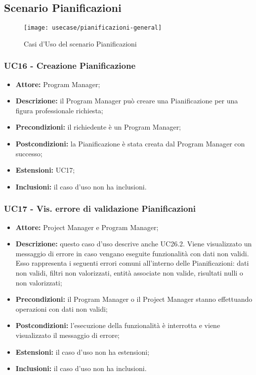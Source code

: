 \subsection{Scenario Pianificazioni}
\begin{figure}[H] 
	\centering
    \texttt{[image: usecase/pianificazioni-general]} 
    \caption{Casi d'Uso del scenario Pianificazioni}
\end{figure}

\subsubsection*{UC16 - Creazione Pianificazione}
\begin{itemize}[label=$\circ$]
\item \textbf{Attore:} Program Manager;
\item \textbf{Descrizione:} il Program Manager può creare una Pianificazione per una figura professionale richiesta;
\item \textbf{Precondizioni:} il richiedente è un Program Manager;
\item \textbf{Postcondizioni:} la Pianificazione è stata creata dal Program Manager con successo;
\item \textbf{Estensioni:} UC17;
\item \textbf{Inclusioni:} il caso d'uso non ha inclusioni.
\end{itemize}

\subsubsection*{UC17 - Vis. errore di validazione Pianificazioni}
\begin{itemize}[label=$\circ$]
\item \textbf{Attore:} Project Manager e Program Manager;
\item \textbf{Descrizione:} questo caso d'uso descrive anche UC26.2. Viene visualizzato un messaggio di errore in caso vengano eseguite funzionalità con dati non validi. Esso rappresenta i seguenti errori comuni all'interno delle Pianificazioni: dati non validi, filtri non valorizzati, entità associate non valide, risultati nulli o non valorizzati;
\item \textbf{Precondizioni:} il Program Manager o il Project Manager stanno effettuando operazioni con dati non validi;
\item \textbf{Postcondizioni:} l'esecuzione della funzionalità è interrotta e viene visualizzato il messaggio di errore;
\item \textbf{Estensioni:} il caso d'uso non ha estensioni;
\item \textbf{Inclusioni:} il caso d'uso non ha inclusioni.
\end{itemize}

